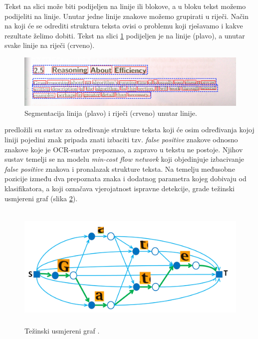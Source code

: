 \documentclass[times, utf8, zavrsni]{fer}
\begin{document}
Tekst na slici može biti podijeljen na linije ili blokove, a u bloku tekst
možemo podijeliti na linije. Unutar jedne linije znakove možemo grupirati u
riječi. Način na koji će se odrediti struktura teksta ovisi o problemu
koji rješavamo i kakve rezultate želimo dobiti. Tekst na slici
\ref{fig:text-segmentation-01} podijeljen je na linije (plavo), a unutar svake
linije na riječi (crveno).

\begin{figure}[htb]
    \centering
    \includegraphics[width=\textwidth]{images/text-segmentation-01.jpg}
    \caption{Segmentacija linija (plavo) i riječi (crveno) unutar linije.}
    \label{fig:text-segmentation-01}
\end{figure}

\citep{DBLP:journals/corr/TianPHLYT16} predložili su sustav za određivanje
strukture teksta koji će osim određivanja kojoj liniji pojedini znak pripada
znati izbaciti tzv. \emph{false positive} znakove odnosno znakove koje je
OCR-sustav prepoznao, a zapravo u tekstu ne postoje. Njihov sustav temelji
se na modelu \emph{min-cost flow network} koji objedinjuje izbacivanje
\emph{false positive} znakova i pronalazak strukture teksta. Na temelju
međusobne pozicije između dva prepoznata znaka i dodatnog parametra kojeg
dobivaju od klasifikatora, a koji označava vjerojatnost ispravne detekcije,
grade težinski usmjereni graf (slika \ref{fig:text-flow}).

\begin{figure}[htb]
    \centering
    \captionsetup{justification=centering}
    \includegraphics[height=6cm]{images/text-flow.png}
    \caption{Težinski usmjereni graf \citep{DBLP:journals/corr/TianPHLYT16}.}
    \label{fig:text-flow}
\end{figure}
\end{document}
